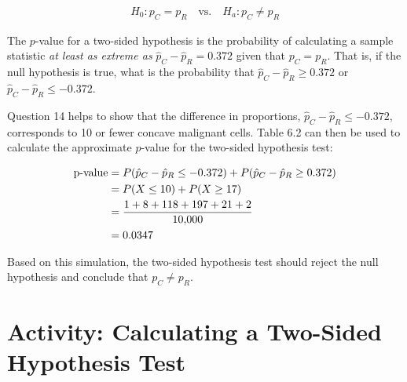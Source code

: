 \documentclass[
]{report}
\begin{document}
\begin{align}\label{6.2}
H_0: p_C = p_R \quad\text{vs.}\quad H_a: p_C \neq p_R 
\tag{6.2}
\end{align}

The \(p\)-value for a two-sided hypothesis is the probability of calculating a sample statistic \emph{at least as extreme as} \(\hat p_C - \hat p_R = 0.372\) given that \(p_C = p_R\). That is, if the null hypothesis is true, what is the probability that \(\hat p_C - \hat p_R \ge 0.372\) or \(\hat p_C - \hat p_R \le -0.372\).

Question 14 helps to show that the difference in proportions, \(\hat p_C - \hat p_R \le -0.372\), corresponds to 10 or fewer concave malignant cells. Table 6.2 can then be used to calculate the approximate \(p\)-value for the two-sided hypothesis test:

\begin{align}
\text{p-value}
&= P(\hat p_C - \hat p_R \le -0.372) + P(\hat p_C - \hat p_R \ge 0.372) \notag \\ \notag
&= P(X \le 10) + P(X \ge 17) \\ \notag 
&= \frac{1 + 8 + 118 + 197 + 21 + 2}{10{,}000} \\ \notag
&= 0.0347 \notag
\end{align}

Based on this simulation, the two-sided hypothesis test should reject the null hypothesis and conclude that \(p_C \neq p_R\).

\section*{Activity: Calculating a Two-Sided Hypothesis Test}\label{activity-calculating-a-two-sided-hypothesis-test}
\end{document}
